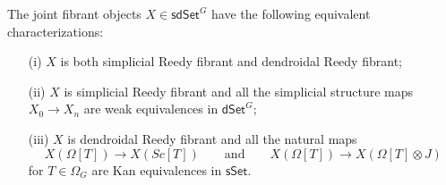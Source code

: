 \documentclass[a4paper,10pt
 ,draft
]{article}%
\begin{document}
\begin{proposition}\label{JOINTFIBCHAR PROP}
The joint fibrant objects $X \in \mathsf{sdSet}^G$ have the following equivalent characterizations:
\begin{itemize}
	\item[(i)] $X$ is both simplicial Reedy fibrant and dendroidal Reedy fibrant;
	\item[(ii)] $X$ is simplicial Reedy fibrant and all the simplicial structure maps 
	$X_0 \to X_n$ are weak equivalences in $\mathsf{dSet}^{G}$;
	\item[(iii)] $X$ is dendroidal Reedy fibrant and all the natural maps
\begin{equation}\label{JOINTFIBCHAR EQ}
	X\left(\Omega[T]\right) \to X\left(Sc[T]\right)
\qquad \text{and} \qquad
	X\left(\Omega[T]\right) \to X(\Omega[T]\otimes J)
\end{equation}
for $T \in \Omega_G$ are Kan equivalences in $\mathsf{sSet}$.
\end{itemize}
\end{proposition}
\end{document}
